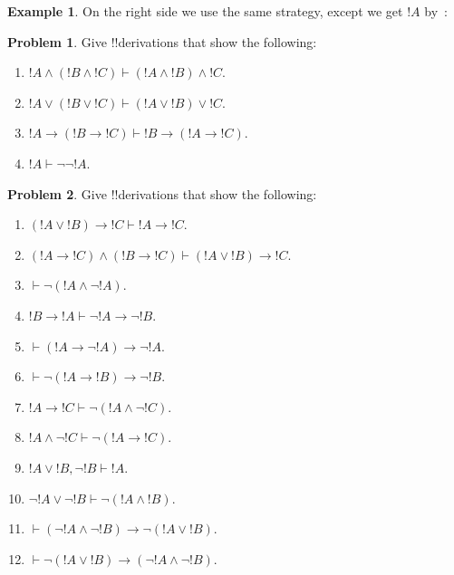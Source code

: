 \documentclass[10pt,a4paper]{article}
\theoremstyle{plain}
\theoremstyle{definition}
\newtheorem{ex}[thm]{Example}
\newtheorem{prob}{Problem}[section]
\theoremstyle{remark}
\providecommand{\AxiomC}[1]{}
\providecommand{\UnaryInfC}[1]{}
\providecommand{\BinaryInfC}[1]{}
\providecommand{\RightLabel}[1]{}
\newenvironment{prooftree}{}{}
\providecommand{\lif}{\mathbin{\rightarrow}}
\providecommand{\lfalse}{\bot}
\providecommand{\Proves}{\mathrel{\vdash}}
\providecommand{\Elim}[1]{}
\providecommand{\Intro}[1]{}
\providecommand{\Discharge}{\mathrm{Dis}}
\providecommand{\Intro}{\mathrm{I}}
\begin{document}
\begin{ex}
\begin{prooftree}
  \AxiomC{$\Discharge{\lnot(!A \lor \lnot !A)}{1}$}
  \RightLabel{\Elim{\lnot}}
  \BinaryInfC{$\lfalse$}
  \UnaryInfC{$!A \lor \lnot !A$}
\end{prooftree}
On the right side we use the same strategy, except we get $!A$ by~\FalseCl:
\begin{prooftree}
  \AxiomC{$\Discharge{\lnot(!A \lor \lnot !A)}{1}$}
  \AxiomC{$\Discharge{!A}{2}$}
  \RightLabel{\Intro{\lor}}
  \UnaryInfC{$!A \lor \lnot !A$}
  \RightLabel{\Elim{\lnot}}
  \BinaryInfC{$\lfalse$}
  \DischargeRule{\Intro{\lnot}}{2}
  \UnaryInfC{$\lnot !A$}
  \AxiomC{$\Discharge{\lnot(!A \lor \lnot !A)}{1}$}
  \AxiomC{$\Discharge{\lnot !A}{3}$}
  \RightLabel{\Intro{\lor}}
  \UnaryInfC{$!A \lor \lnot !A$}
  \RightLabel{\Elim{\lnot}}
  \BinaryInfC{$\lfalse$}
  \UnaryInfC{$!A$}
  \RightLabel{\Elim{\lnot}}
  \BinaryInfC{$\lfalse$}
  \UnaryInfC{$!A \lor \lnot !A$}
\end{prooftree}
\end{ex}

\begin{prob}
Give !!{derivation}s that show the following:
\begin{enumerate}
\item $!A \land (!B \land !C) \Proves (!A \land !B) \land !C$.
\item $!A \lor (!B \lor !C) \Proves (!A \lor !B) \lor !C$.
\item $!A \lif (!B \lif !C) \Proves !B \lif (!A \lif !C)$.
\item $!A \Proves \lnot\lnot !A$.
\end{enumerate}
\end{prob}

\begin{prob}
Give !!{derivation}s that show the following:
\begin{enumerate}
\item $(!A \lor !B) \lif !C \Proves !A \lif !C$.
\item $(!A \lif !C) \land (!B \lif !C) \Proves (!A \lor !B) \lif !C$.
\item $\Proves \lnot(!A \land \lnot !A)$.
\item $!B \lif !A \Proves \lnot !A \lif \lnot !B$.
\item $\Proves (!A \lif \lnot !A) \lif \lnot !A$.
\item $\Proves \lnot(!A \lif !B) \lif \lnot !B$.
\item $!A \lif !C \Proves \lnot (!A \land \lnot !C)$.
\item $!A \land \lnot !C \Proves \lnot (!A \lif !C)$.
\item $!A \lor !B, \lnot !B \Proves !A$.
\item $\lnot !A \lor \lnot !B \Proves \lnot(!A \land !B)$.
\item $\Proves (\lnot !A \land \lnot !B) \lif\lnot(!A \lor !B)$.
\item $\Proves \lnot(!A \lor !B) \lif (\lnot !A \land \lnot !B)$.
\end{enumerate}
\end{prob}
\end{document}
